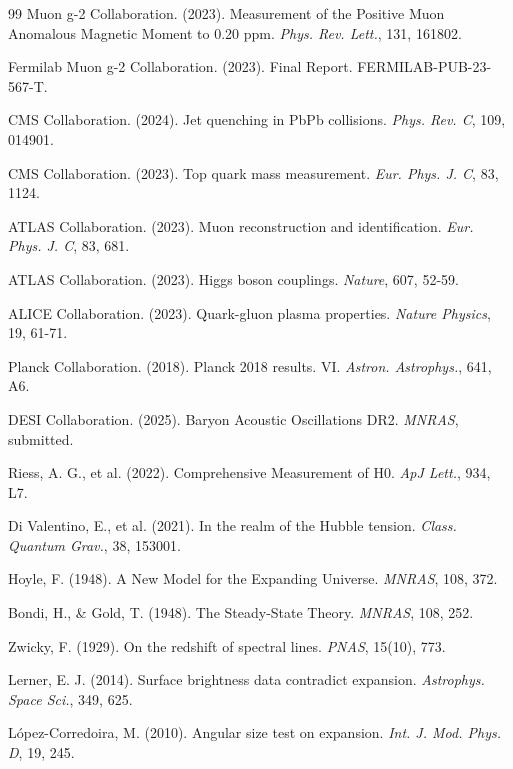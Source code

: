 \begin{thebibliography}{99}
		Muon g-2 Collaboration. (2023). Measurement of the Positive Muon Anomalous Magnetic Moment to 0.20 ppm. \emph{Phys. Rev. Lett.}, 131, 161802.
		
		Fermilab Muon g-2 Collaboration. (2023). Final Report. FERMILAB-PUB-23-567-T.
		
		CMS Collaboration. (2024). Jet quenching in PbPb collisions. \emph{Phys. Rev. C}, 109, 014901.
		
		CMS Collaboration. (2023). Top quark mass measurement. \emph{Eur. Phys. J. C}, 83, 1124.
		
		ATLAS Collaboration. (2023). Muon reconstruction and identification. \emph{Eur. Phys. J. C}, 83, 681.
		
		ATLAS Collaboration. (2023). Higgs boson couplings. \emph{Nature}, 607, 52-59.
		
		ALICE Collaboration. (2023). Quark-gluon plasma properties. \emph{Nature Physics}, 19, 61-71.
		
		Planck Collaboration. (2018). Planck 2018 results. VI. \emph{Astron. Astrophys.}, 641, A6.
		
		DESI Collaboration. (2025). Baryon Acoustic Oscillations DR2. \emph{MNRAS}, submitted.
		
		Riess, A. G., et al. (2022). Comprehensive Measurement of H0. \emph{ApJ Lett.}, 934, L7.
		
		Di Valentino, E., et al. (2021). In the realm of the Hubble tension. \emph{Class. Quantum Grav.}, 38, 153001.
		
		Hoyle, F. (1948). A New Model for the Expanding Universe. \emph{MNRAS}, 108, 372.
		
		Bondi, H., \& Gold, T. (1948). The Steady-State Theory. \emph{MNRAS}, 108, 252.
		
		Zwicky, F. (1929). On the redshift of spectral lines. \emph{PNAS}, 15(10), 773.
		
		Lerner, E. J. (2014). Surface brightness data contradict expansion. \emph{Astrophys. Space Sci.}, 349, 625.
		
		López-Corredoira, M. (2010). Angular size test on expansion. \emph{Int. J. Mod. Phys. D}, 19, 245.
		

\end{thebibliography}

